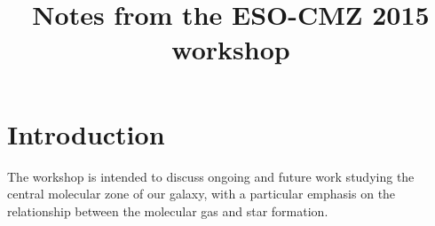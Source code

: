 \title{Notes from the ESO-CMZ 2015 workshop}
\section{Introduction}
The workshop is intended to discuss ongoing and future work studying the central molecular zone of our galaxy, with a particular emphasis on the relationship between the molecular gas and star formation.
